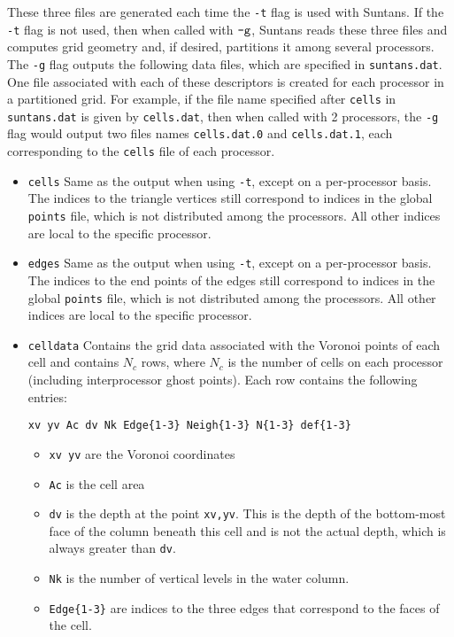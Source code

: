 \documentclass[12pt,oneside]{article}
\begin{document}
These three files are generated each time the \verb+-t+ flag is used with Suntans.  If
the \verb+-t+ flag is not used, then when called with $\verb+-g+$, Suntans reads these
three files and computes grid geometry and, if desired, partitions it among several processors.
The \verb+-g+ flag outputs the following data files, which are specified in \verb+suntans.dat+.
One file associated with each of these descriptors is created for each processor in a partitioned
grid.  For example, if the file name specified after \verb+cells+ in \verb+suntans.dat+ is given
by \verb+cells.dat+, then when called with 2 processors, the \verb+-g+ flag would output two files
names \verb+cells.dat.0+ and \verb+cells.dat.1+, each corresponding to the \verb+cells+ file of
each processor.
\begin{itemize}
\item \verb+cells+ Same as the output when using \verb+-t+, except on a per-processor basis.
The indices to the triangle vertices still correspond to indices in the global \verb+points+ file, which is
not distributed among the processors.  All other indices are local to the specific processor.
\item \verb+edges+ Same as the output when using \verb+-t+, except on a per-processor basis.
The indices to the end points of the edges still correspond to indices in the global \verb+points+ file, which is
not distributed among the processors.  All other indices are local to the specific processor.
\item \verb+celldata+ Contains the grid data associated with the Voronoi points of each cell and contains
$N_c$ rows, where $N_c$ is the number of cells on each processor (including interprocessor ghost points).
Each row contains the following entries:
\begin{verbatim}
xv yv Ac dv Nk Edge{1-3} Neigh{1-3} N{1-3} def{1-3}
\end{verbatim}
\begin{itemize}
\item \verb+xv yv+ are the Voronoi coordinates
\item \verb+Ac+ is the cell area
\item \verb+dv+ is the depth at the point \verb+xv,yv+.  This is the depth of the bottom-most
face of the column beneath this cell and is not the actual depth, which is always greater than
\verb+dv+.
\item \verb+Nk+ is the number of vertical levels in the water column.
\item \verb+Edge{1-3}+ are indices to the three edges that correspond to the faces of the cell.

\end{itemize}
\end{itemize}
\end{document}
